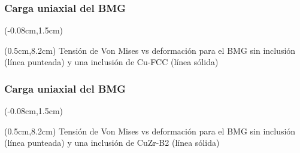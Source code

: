 \begin{frame}
 \frametitle{Carga uniaxial del BMG}
  \begin{textblock*}{12.6cm}(-0.08cm,1.5cm) 
      \begin{figure}[htp]
	\centering
      \end{figure}
    \end{textblock*}
    \begin{textblock*}{12cm}(0.5cm,8.2cm) 
    \centering
      Tensi\'on de Von Mises vs deformaci\'on para el BMG sin inclusi\'on (l\'inea punteada) y una inclusi\'on de Cu-FCC (l\'inea s\'olida)
    \end{textblock*}
\end{frame}
\begin{frame}
  \frametitle{Carga uniaxial del BMG}
    \begin{textblock*}{12.6cm}(-0.08cm,1.5cm) 
      \begin{figure}[htp]
	\centering
      \end{figure}
    \end{textblock*}
    \begin{textblock*}{12cm}(0.5cm,8.2cm) 
    \centering
      Tensi\'on de Von Mises vs deformaci\'on para el BMG sin inclusi\'on (l\'inea punteada) y una inclusi\'on de CuZr-B2 (l\'inea s\'olida)
    \end{textblock*}
\end{frame}

